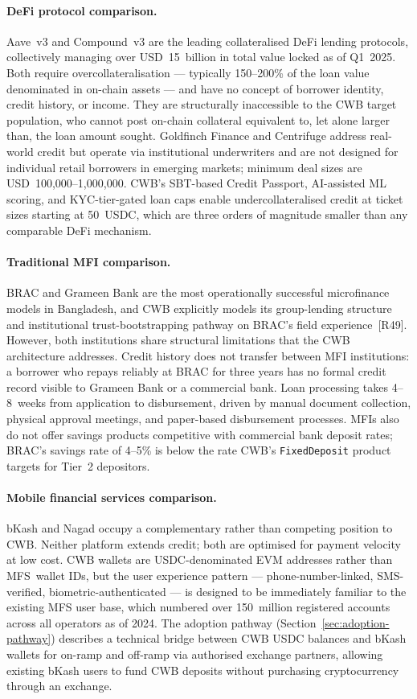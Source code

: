 \paragraph{DeFi protocol comparison.}
Aave~v3 and Compound~v3 are the leading collateralised DeFi lending
protocols, collectively managing over USD~15~billion in total value locked as
of Q1~2025. Both require overcollateralisation --- typically 150--200\% of
the loan value denominated in on-chain assets --- and have no concept of
borrower identity, credit history, or income. They are structurally
inaccessible to the CWB target population, who cannot post on-chain
collateral equivalent to, let alone larger than, the loan amount sought.
Goldfinch Finance and Centrifuge address real-world credit but operate via
institutional underwriters and are not designed for individual retail
borrowers in emerging markets; minimum deal sizes are USD~100,000--1,000,000.
CWB's SBT-based Credit Passport, AI-assisted ML scoring, and KYC-tier-gated
loan caps enable undercollateralised credit at ticket sizes starting at
50~USDC, which are three orders of magnitude smaller than any comparable DeFi
mechanism.

\paragraph{Traditional MFI comparison.}
BRAC and Grameen Bank are the most operationally successful microfinance
models in Bangladesh, and CWB explicitly models its group-lending structure
and institutional trust-bootstrapping pathway on BRAC's field
experience~[R49]. However, both institutions share structural limitations that
the CWB architecture addresses. Credit history does not transfer between MFI
institutions: a borrower who repays reliably at BRAC for three years has no
formal credit record visible to Grameen Bank or a commercial bank. Loan
processing takes 4--8~weeks from application to disbursement, driven by
manual document collection, physical approval meetings, and paper-based
disbursement processes. MFIs also do not offer savings products competitive
with commercial bank deposit rates; BRAC's savings rate of 4--5\% is below
the rate CWB's \texttt{FixedDeposit} product targets for Tier~2 depositors.

\paragraph{Mobile financial services comparison.}
bKash and Nagad occupy a complementary rather than competing position to CWB.
Neither platform extends credit; both are optimised for payment velocity at
low cost. CWB wallets are USDC-denominated EVM addresses rather than
MFS~wallet IDs, but the user experience pattern --- phone-number-linked,
SMS-verified, biometric-authenticated --- is designed to be immediately
familiar to the existing MFS user base, which numbered over 150~million
registered accounts across all operators as of 2024. The adoption pathway
(Section~\ref{sec:adoption-pathway}) describes a technical bridge between
CWB USDC balances and bKash wallets for on-ramp and off-ramp via authorised
exchange partners, allowing existing bKash users to fund CWB deposits without
purchasing cryptocurrency through an exchange.

